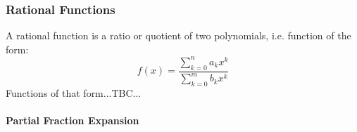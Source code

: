 %
%
%  



\subsubsection{Rational Functions}
A rational function is a ratio or quotient of two polynomials, i.e. function of the form:
\begin{equation}
 f(x) = \frac{\sum_{k=0}^n a_k x^k}{\sum_{k=0}^m b_k x^k}
\end{equation}
Functions of that form...TBC...


\paragraph{Partial Fraction Expansion}




